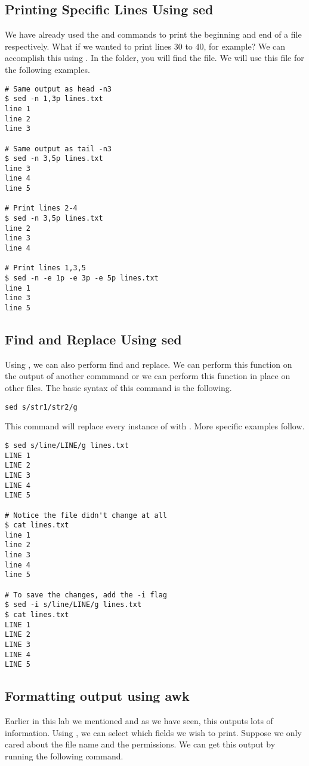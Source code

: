 \subsection*{Printing Specific Lines Using sed}
We have already used the  and  commands to print the beginning and end of a file respectively.
What if we wanted to print lines $30$ to $40$, for example?
We can accomplish this using .
In the  folder, you will find the  file.
We will use this file for the following examples.

\begin{lstlisting}
# Same output as head -n3
$ sed -n 1,3p lines.txt
line 1
line 2
line 3

# Same output as tail -n3
$ sed -n 3,5p lines.txt
line 3
line 4
line 5

# Print lines 2-4
$ sed -n 3,5p lines.txt
line 2
line 3
line 4

# Print lines 1,3,5
$ sed -n -e 1p -e 3p -e 5p lines.txt 
line 1
line 3
line 5
\end{lstlisting}  

\subsection*{Find and Replace Using sed}

Using , we can also perform find and replace.
We can perform this function on the output of another commmand or we can perform this function in place on other files.
The basic syntax of this  command is the following.

\begin{lstlisting}
sed s/str1/str2/g
\end{lstlisting} 

This command will replace every instance of  with . More specific examples follow.

\begin{lstlisting}
$ sed s/line/LINE/g lines.txt
LINE 1
LINE 2
LINE 3
LINE 4
LINE 5

# Notice the file didn't change at all
$ cat lines.txt
line 1
line 2
line 3
line 4
line 5

# To save the changes, add the -i flag
$ sed -i s/line/LINE/g lines.txt
$ cat lines.txt
LINE 1
LINE 2
LINE 3
LINE 4
LINE 5
\end{lstlisting}

\subsection*{Formatting output using awk}
Earlier in this lab we mentioned  and as we have seen, this outputs lots of information.
Using , we can select which fields we wish to print.
Suppose we only cared about the file name and the permissions.
We can get this output by running the following command.

